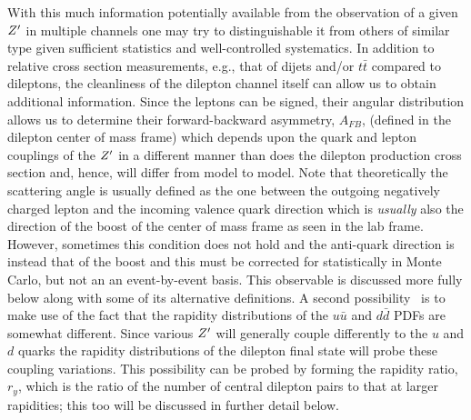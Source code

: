 With this much information potentially available from the observation of a given $Z^{\prime}$ in multiple channels one may try to distinguishable it from others of similar type given 
sufficient statistics and 
well-controlled systematics. In addition to relative cross section measurements,  e.g., that of dijets and/or $t\bar t$ compared to dileptons, the cleanliness of the dilepton channel itself 
can allow us to obtain additional information.  Since the leptons can be signed, their angular distribution allows us to determine their forward-backward asymmetry, $A_{FB}$, (defined in the 
dilepton center of mass frame) which depends upon the quark and lepton couplings of the $Z^{\prime}$ in a different manner than does the dilepton production cross section and, hence, will 
differ from model to model. Note that theoretically the scattering angle is usually defined as the one between the outgoing negatively charged lepton and the incoming valence quark direction which is {\it usually} also the direction of the boost of the center of mass frame as seen in the lab frame. However, sometimes this condition does not hold and the anti-quark direction is 
instead that of the boost and this must be corrected for statistically in Monte Carlo, but not an an event-by-event basis. This observable is discussed more fully below along with some of its 
alternative definitions. A second possibility~\cite{delAguila:1993ym} is to make use of the fact 
that the rapidity distributions of the $u\bar u$ and $d\bar d$ PDFs are somewhat different. Since various $Z^{\prime}$ will generally couple differently to the  $u$ and $d$ quarks the 
rapidity distributions of the dilepton final state will probe these coupling variations. This possibility can be probed by forming the rapidity ratio, $r_y$, which is the ratio of the number of 
central dilepton pairs to that at larger rapidities; this too will be discussed in further detail below. 

